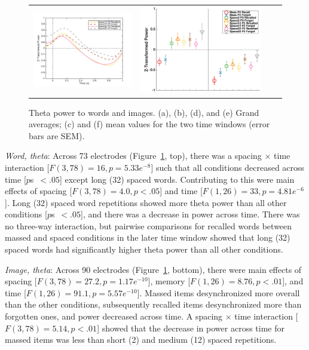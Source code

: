 \begin{figure}[H]
\begin{tabular}{cccc}
  \includegraphics[width=.30\textwidth]{./figs/exp2/tfr_line/tfr_line_ga_img_rc_spac12_p2_img_fo_spac12_p2_img_rc_spac32_p2_img_fo_spac32_p2_4_8_-100_1000_90ROIs_legend} &
  \includegraphics[width=.30\textwidth]{./figs/exp2/tfr_avg/tfr_avg_ga_img_rc_mass_p2_img_fo_mass_p2_img_rc_spac2_p2_img_fo_spac2_p2_img_rc_spac12_p2_img_fo_spac12_p2_img_rc_spac32_p2_img_fo_spac32_p2_4_8_0_500_500_1000_90ROI_ylabel} \\
  \end{tabular}
  \caption{Theta power to words and images.  (a), (b), (d), and (e) Grand averages; (c) and (f) mean values for the two time windows (error bars are SEM).}
  \label{fig:s2_word_img_theta}
\end{figure}

\textit{Word, theta}: Across 73 electrodes (Figure~\ref{fig:s2_word_img_theta}, top), there was a spacing $\times$ time interaction [$F(3,78)=16, p=5.33e^{-8}$] such that all conditions decreased across time [$p$s~$<.05$] except long (32) spaced words.  Contributing to this were main effects of spacing [$F(3,78)=4.0, p<.05$] and time [$F(1,26)=33, p=4.81e^{-6}$].  Long (32) spaced word repetitions showed more theta power than all other conditions [$p$s~$<.05$], and there was a decrease in power across time.
There was no three-way interaction, but pairwise comparisons for recalled words between massed and spaced conditions in the later time window showed that long (32) spaced words had significantly higher theta power than all other conditions.

\textit{Image, theta}: Across 90 electrodes (Figure~\ref{fig:s2_word_img_theta}, bottom), there were main effects of spacing [$F(3,78)=27.2, p=1.17e^{-10}$], memory [$F(1,26)=8.76, p<.01$], and time [$F(1,26)=91.1, p=5.57e^{-10}$].  Massed items desynchronized more overall than the other conditions, subsequently recalled items desynchronized more than forgotten ones, and power decreased across time.  A spacing $\times$ time interaction [$F(3,78)=5.14, p<.01$] showed that the decrease in power across time for massed items was less than short (2) and medium (12) spaced repetitions.

